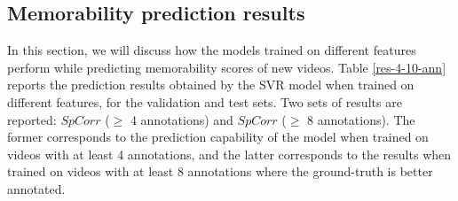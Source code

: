 \documentclass[sigconf]{acmart}
\begin{document}
\subsection{Memorability prediction results}
\label{pred-res}
In this section, we will discuss how the models trained on different features perform while predicting memorability scores of new videos.
Table \ref{res-4-10-ann} reports the prediction results obtained by the SVR model when trained on different features, for the validation and test sets.
Two sets of results are reported: $SpCorr$ ($\geq$ 4 annotations) and $SpCorr$ ($\geq$ 8 annotations). The former 
corresponds to the prediction capability of the model when trained on videos with at least 4 annotations, and the latter corresponds to the results when trained on videos with at least 8 annotations where the ground-truth is better annotated.
\end{document}
